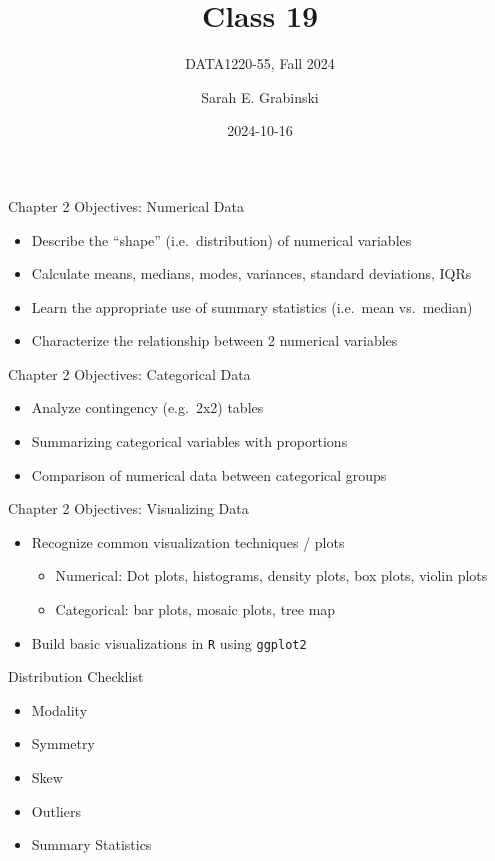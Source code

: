 \documentclass[
  ignorenonframetext,
]{beamer}
\title{Class 19}
\subtitle{DATA1220-55, Fall 2024}
\author{Sarah E. Grabinski}
\date{2024-10-16}
\begin{document}
\frame{\titlepage}


\begin{frame}{Chapter 2 Objectives: Numerical Data}
\label{chapter-2-objectives-numerical-data}
\begin{itemize}
\item
  Describe the ``shape'' (i.e.~distribution) of numerical variables
\item
  Calculate means, medians, modes, variances, standard deviations, IQRs
\item
  Learn the appropriate use of summary statistics (i.e.~mean vs.~median)
\item
  Characterize the relationship between 2 numerical variables
\end{itemize}
\end{frame}

\begin{frame}{Chapter 2 Objectives: Categorical Data}
\label{chapter-2-objectives-categorical-data}
\begin{itemize}
\item
  Analyze contingency (e.g.~2x2) tables
\item
  Summarizing categorical variables with proportions
\item
  Comparison of numerical data between categorical groups
\end{itemize}
\end{frame}

\begin{frame}[fragile]{Chapter 2 Objectives: Visualizing Data}
\label{chapter-2-objectives-visualizing-data}
\begin{itemize}
\item
  Recognize common visualization techniques / plots

  \begin{itemize}
  \item
    Numerical: Dot plots, histograms, density plots, box plots, violin
    plots
  \item
    Categorical: bar plots, mosaic plots, tree map
  \end{itemize}
\item
  Build basic visualizations in \texttt{R} using \texttt{ggplot2}
\end{itemize}
\end{frame}

\begin{frame}{Distribution Checklist}
\label{distribution-checklist}
\begin{itemize}
\item
  Modality
\item
  Symmetry
\item
  Skew
\item
  Outliers
\item
  Summary Statistics
\end{itemize}
\end{frame}
\end{document}
